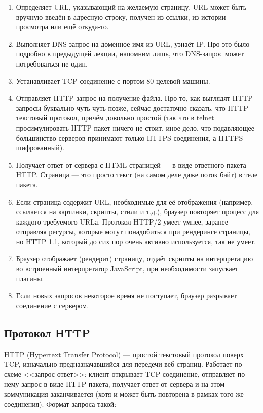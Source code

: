 \documentclass[a5paper]{article}
\begin{document}
\begin{enumerate}
    \item Определяет URL, указывающий на желаемую страницу. URL может быть вручную введён в адресную строку, получен из ссылки, из истории просмотра или ещё откуда-то.
    \item Выполняет DNS-запрос на доменное имя из URL, узнаёт IP. Про это было подробно в предыдущей лекции, напомним лишь, что DNS-запрос может потребоваться не один.
    \item Устанавливает TCP-соединение с портом 80 целевой машины.
    \item Отправляет HTTP-запрос на получение файла. Про то, как выглядят HTTP-запросы буквально чуть-чуть позже, сейчас достаточно сказать, что HTTP --- текстовый протокол, причём довольно простой (так что в telnet просимулировать HTTP-пакет ничего не стоит, иное дело, что подавляющее большинство серверов принимают только HTTPS-соединения, а HTTPS шифрованный).
    \item Получает ответ от сервера с HTML-страницей --- в виде ответного пакета HTTP. Страница --- это просто текст (на самом деле даже поток байт) в теле пакета.
    \item Если страница содержит URL, необходимые для её отображения (например, ссылается на картинки, скрипты, стили и т.д.), браузер повторяет процесс для каждого требуемого URLа. Протокол HTTP/2 умеет умнее, заранее отправляя ресурсы, которые могут понадобиться при рендеринге страницы, но HTTP 1.1, который до сих пор очень активно используется, так не умеет.
    \item Браузер отображает (рендерит) страницу, отдаёт скрипты на интерпретацию во встроенный интерпретатор JavaScript, при необходимости запускает плагины.
    \item Если новых запросов некоторое время не поступает, браузер разрывает соединение с сервером.
\end{enumerate}

\subsection{Протокол HTTP}

HTTP (Hypertext Transfer Protocol) --- простой текстовый протокол поверх TCP, изначально предназначавшийся для передечи веб-страниц. Работает по схеме <<запрос-ответ>>: клиент открывает TCP-соединение, отправляет по нему запрос в виде HTTP-пакета, получает ответ от сервера и на этом коммуникация заканчивается (хотя и может быть повторена в рамках того же соединения). Формат запроса такой:
\end{document}
